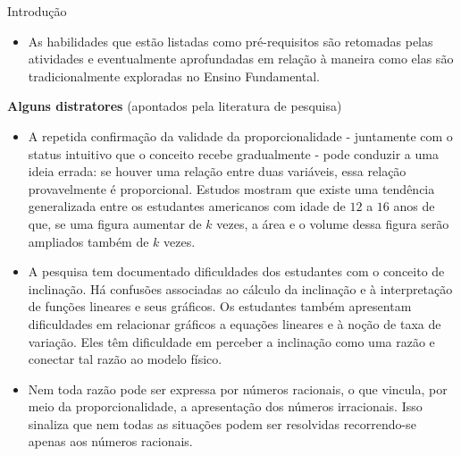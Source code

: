 \begin{apresentacao}{Introdução}
\begin{itemize}
\item {} 
As habilidades que estão listadas como pré-requisitos são retomadas pelas atividades e eventualmente aprofundadas em relação à maneira como elas são tradicionalmente exploradas no Ensino Fundamental.

\end{itemize}

\textbf{Alguns distratores} (apontados pela literatura de pesquisa)
\begin{itemize}
\item {} 
A repetida confirmação da validade da proporcionalidade - juntamente com o status intuitivo que o conceito recebe gradualmente - pode conduzir a uma ideia errada: se houver uma relação entre duas variáveis, essa relação provavelmente é proporcional. Estudos mostram que existe uma tendência generalizada entre os estudantes americanos com idade de \(12\) a \(16\) anos de que, se uma figura aumentar de \(k\) vezes, a área e o volume dessa figura serão ampliados também de \(k\) vezes. \citep{Dooren-et-al-2005}

\item {} 
A pesquisa tem documentado dificuldades dos estudantes com o conceito de inclinação. Há confusões associadas ao cálculo da inclinação e à interpretação de funções lineares e seus gráficos. Os estudantes também apresentam dificuldades em relacionar gráficos a equações lineares e à noção de taxa de variação. Eles têm dificuldade em perceber a inclinação como uma razão e conectar tal razão ao modelo físico. \citep{Stump-1999}

\item {} 
Nem toda razão pode ser expressa por números racionais, o que vincula, por meio da proporcionalidade, a apresentação dos números irracionais. Isso sinaliza que nem todas as situações podem ser resolvidas recorrendo-se apenas aos números racionais. \citep{Silva-et-al-2013}

\end{itemize}
\end{apresentacao}

